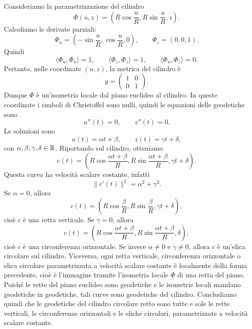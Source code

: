 \documentclass[a4paper]{article}
\begin{document}
\begin{snippetproof}{}
    Consideriamo la parametrizzazione del cilindro
    \[
        \Phi(u,z)=
        \left(
            R\cos\frac{u}{R},
            R\sin\frac{u}{R},
            z
        \right).
    \]
    Calcoliamo le derivate parziali:
    \[
        \Phi_u=
        \left(
            -\sin\frac{u}{R},
            \cos\frac{u}{R},
            0
        \right),
        \qquad
        \Phi_z=(0,0,1).
    \]
    Quindi
    \[
        \langle \Phi_u,\Phi_u\rangle=1,
        \qquad
        \langle \Phi_z,\Phi_z\rangle=1,
        \qquad
        \langle \Phi_u,\Phi_z\rangle=0.
    \]
    Pertanto, nelle coordinate \((u,z)\), la metrica del cilindro è
    \[
        g=
        \begin{pmatrix}
            1 & 0\\
            0 & 1
        \end{pmatrix}.
    \]
    Dunque \(\Phi\) è un'isometria locale dal piano euclideo al cilindro. In queste coordinate i simboli di Christoffel sono nulli, quindi le equazioni delle geodetiche sono
    \[
        u''(t)=0,
        \qquad
        z''(t)=0.
    \]
    Le soluzioni sono
    \[
        u(t)=\alpha t+\beta,
        \qquad
        z(t)=\gamma t+\delta,
    \]
    con \(\alpha,\beta,\gamma,\delta\in\mathbb{R}\). Riportando sul cilindro, otteniamo
    \[
        c(t)=
        \left(
            R\cos\frac{\alpha t+\beta}{R},
            R\sin\frac{\alpha t+\beta}{R},
            \gamma t+\delta
        \right).
    \]
    Questa curva ha velocità scalare costante, infatti
    \[
        \|c'(t)\|^2=\alpha^2+\gamma^2.
    \]
    Se \(\alpha=0\), allora
    \[
        c(t)=
        \left(
            R\cos\frac{\beta}{R},
            R\sin\frac{\beta}{R},
            \gamma t+\delta
        \right),
    \]
    cioè \(c\) è una retta verticale.
    Se \(\gamma=0\), allora
    \[
        c(t)=
        \left(
            R\cos\frac{\alpha t+\beta}{R},
            R\sin\frac{\alpha t+\beta}{R},
            \delta
        \right),
    \]
    cioè \(c\) è una circonferenza orizzontale.
    Se invece \(\alpha\neq0\) e \(\gamma\neq0\), allora \(c\) è un'elica circolare sul cilindro.
    Viceversa, ogni retta verticale, circonferenza orizzontale o elica circolare parametrizzata a velocità scalare costante è localmente della forma precedente, cioè è l'immagine tramite l'isometria locale \(\Phi\) di una retta del piano. Poiché le rette del piano euclideo sono geodetiche e le isometrie locali mandano geodetiche in geodetiche, tali curve sono geodetiche del cilindro.
    Concludiamo quindi che le geodetiche del cilindro circolare retto sono tutte e sole le rette verticali, le circonferenze orizzontali e le eliche circolari, parametrizzate a velocità scalare costante.
\end{snippetproof}
\end{document}
